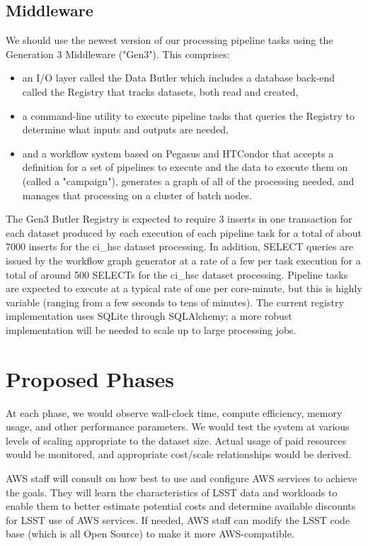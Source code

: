 \subsection{Middleware} \label{sec:drp-middleware}
We should use the newest version of our processing pipeline tasks using the Generation 3 Middleware ("Gen3").
This comprises:
\begin{itemize}
\item an I/O layer called the Data Butler which includes a database back-end called the Registry that tracks datasets, both read and created,
\item a command-line utility to execute pipeline tasks that queries the Registry to determine what inputs and outputs are needed,
\item and a workflow system based on Pegasus and HTCondor that accepts a definition for a set of pipelines to execute and the data to execute them on (called a "campaign"), generates a graph of all of the processing needed, and manages that processing on a cluster of batch nodes.
\end{itemize}

The Gen3 Butler Registry is expected to require 3 inserts in one transaction for each dataset produced by each execution of each pipeline task for a total of about 7000 inserts for the ci\_hsc dataset processing.
In addition, SELECT queries are issued by the workflow graph generator at a rate of a few per task execution for a total of around 500 SELECTs for the ci\_hsc dataset processing.
Pipeline tasks are expected to execute at a typical rate of one per core-minute, but this is highly variable (ranging from a few seconds to tens of minutes).
The current registry implementation uses SQLite through SQLAlchemy; a more robust implementation will be needed to scale up to large processing jobs.

\section{Proposed Phases} \label{sec:phases}
At each phase, we would observe wall-clock time, compute efficiency, memory usage, and other performance parameters.
We would test the system at various levels of scaling appropriate to the dataset size.
Actual usage of paid resources would be monitored, and appropriate cost/scale relationships would be derived.

AWS staff will consult on how best to use and configure AWS services to achieve the goals.
They will learn the characteristics of LSST data and workloads to enable them to better estimate potential costs and determine available discounts for LSST use of AWS services.
If needed, AWS staff can modify the LSST code base (which is all Open Source) to make it more AWS-compatible.

